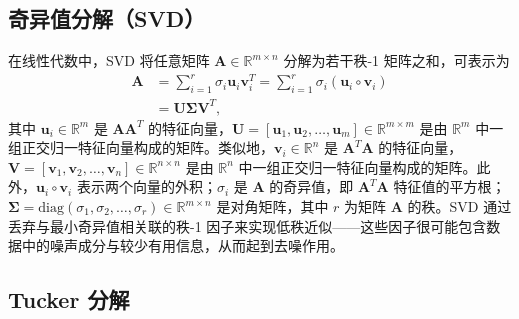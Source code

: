 \documentclass[conference]{IEEEtran}
\begin{document}
\subsection{奇异值分解（SVD）}
在线性代数中，SVD 将任意矩阵 $\mathbf{A} \in \mathbb{R}^{m \times n}$ 分解为若干秩-1 矩阵之和，可表示为
\begin{equation}
\begin{split}
    \mathbf{A} &=  \sum_{i=1}^{r} \sigma_i \mathbf{u}_i \mathbf{v}_i^T = \sum_{i=1}^{r} \sigma_i \left( \mathbf{u}_i \circ \mathbf{v}_i \right)\\
    &= \mathbf{U} \boldsymbol{\Sigma} \mathbf{V}^T,
\end{split}
\label{eq:SVD}
\end{equation}
其中 $\mathbf{u}_i \in \mathbb{R}^m$ 是 $\mathbf{A}\mathbf{A}^T$ 的特征向量，$\mathbf{U} = \left[\mathbf{u}_1, \mathbf{u}_2, \dots, \mathbf{u}_m \right] \in \mathbb{R}^{m \times m}$ 是由 $\mathbb{R}^{m}$ 中一组正交归一特征向量构成的矩阵。类似地，$\mathbf{v}_i \in \mathbb{R}^n$ 是 $\mathbf{A}^T\mathbf{A}$ 的特征向量，$\mathbf{V} = \left[\mathbf{v}_1, \mathbf{v}_2, \dots, \mathbf{v}_n \right] \in \mathbb{R}^{n \times n}$ 是由 $\mathbb{R}^{n}$ 中一组正交归一特征向量构成的矩阵。此外，$\mathbf{u}_i \circ \mathbf{v}_i$ 表示两个向量的外积；$\sigma_i$ 是 $\mathbf{A}$ 的奇异值，即 $\mathbf{A}^T\mathbf{A}$ 特征值的平方根；$\boldsymbol{\Sigma} = \text{diag}\left( \sigma_1, \sigma_2, \dots, \sigma_r \right) \in \mathbb{R}^{m \times n}$ 是对角矩阵，其中 $r$ 为矩阵 $\mathbf{A}$ 的秩。SVD 通过丢弃与最小奇异值相关联的秩-1 因子来实现低秩近似——这些因子很可能包含数据中的噪声成分与较少有用信息，从而起到去噪作用。


\subsection{Tucker 分解}
\end{document}
